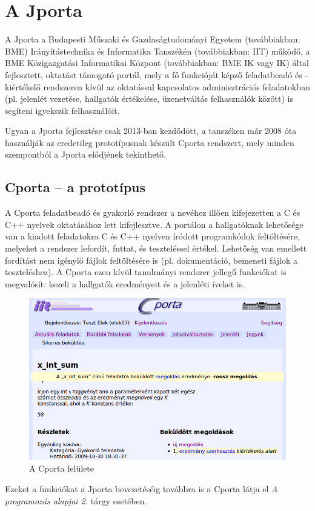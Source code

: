 \chapter{A Jporta}\label{chapter:jporta}

A Jporta a Budapesti Műszaki és Gazdaságtudományi Egyetem (továbbiakban: BME) Irányítástechnika és Informatika Tanszékén (továbbiakban: IIT) működő, a BME Közigazgatási Informatikai Központ (továbbiakban: BME IK vagy IK) által fejlesztett, oktatást támogató portál, mely a fő funkcióját képző feladatbeadó és -kiértékelő rendszeren kívül az oktatással kapcsolatos adminisztrációs feladatokban (pl. jelenlét vezetése, hallgatók értékelése, üzenetváltás felhasználók között) is segíteni igyekszik felhasználóit.

Ugyan a Jporta fejlesztése csak 2013-ban kezdődött, a tanszéken már 2008 óta használják az eredetileg prototípusnak készült Cporta rendszert, mely minden szempontból a Jporta elődjének tekinthető.

\section{Cporta -- a prototípus}
A Cporta feladatbeadó és gyakorló rendszer a nevéhez illően kifejezetten a C és C++ nyelvek oktatásához lett kifejlesztve.
A portálon a hallgatóknak lehetősége van a kiadott feladatokra C és C++ nyelven íródott programkódok feltöltésére, melyeket a rendszer lefordít, futtat, és teszteléssel értékel.
Lehetőség van emellett fordítást nem igénylő fájlok feltöltésére is (pl. dokumentáció, bemeneti fájlok a teszteléshez).
A Cporta ezen kívül tanulmányi rendszer jellegű funkciókat is megvalósít: kezeli a hallgatók eredményeit és a jelenléti íveket is.
\cite{Ory13}
\begin{figure}
    \centering
    \includegraphics[width=\textwidth]{figures/Cporta}
    \caption{A Cporta felülete}
\end{figure}
Ezeket a funkciókat a Jporta bevezetéséig továbbra is a Cporta látja el \textit{A programozás alapjai 2.} tárgy esetében.

